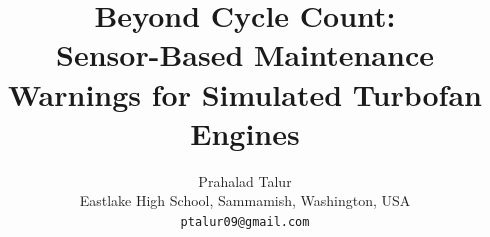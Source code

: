 \documentclass[10pt]{article}
\title{Beyond Cycle Count:\\
Sensor-Based Maintenance Warnings for Simulated Turbofan Engines}
\author{Prahalad Talur\\
\small Eastlake High School, Sammamish, Washington, USA\\
\small \texttt{ptalur09@gmail.com}}
\date{}
\begin{document}
\maketitle











\begingroup
\footnotesize


\endgroup
\end{document}
